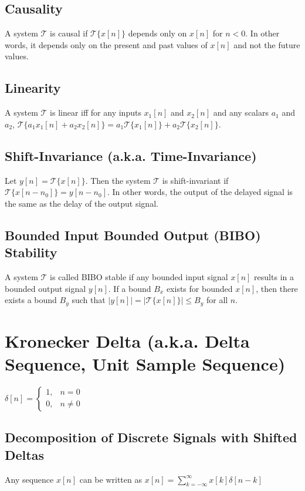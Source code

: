 \documentclass[11pt]{article}
\begin{document}
\subsection{Causality}
A system $\mathcal{T}$ is causal if $\mathcal{T}\{x[n]\}$ depends only on $x[n]$ for $n < 0$. In other words, it depends only on the present and past values of $x[n]$ and not the future values.

\subsection{Linearity}
A system $\mathcal{T}$ is linear iff for any inputs $x_1[n]$ and $x_2[n]$ and any scalars $a_1$ and $a_2$, $\mathcal{T}\{a_1x_1[n]+a_2x_2[n]\} = a_1\mathcal{T}\{x_1[n]\}+a_2\mathcal{T}\{x_2[n]\}$. 

\subsection{Shift-Invariance (a.k.a. Time-Invariance)}
Let $y[n] = \mathcal{T}\{x[n]\}$. Then the system $\mathcal{T}$ is shift-invariant if $\mathcal{T}\{x[n-n_0]\} = y[n-n_0]$. In other words, the output of the delayed signal is the same as the delay of the output signal.

\subsection{Bounded Input Bounded Output (BIBO) Stability}
A system $\mathcal{T}$ is called BIBO stable if any bounded input signal $x[n]$ results in a bounded output signal $y[n]$. If a bound $B_x$ exists for bounded $x[n]$, then there exists a bound $B_y$ such that $|y[n]|=|\mathcal{T}\{x[n]\}| \leq B_y$ for all $n$.

\section{Kronecker Delta (a.k.a. Delta Sequence, Unit Sample Sequence)}

$\delta[n] = \begin{cases}1, & n = 0 \\ 0, & n\neq 0 \end{cases}$

\subsection{Decomposition of Discrete Signals with Shifted Deltas}
Any sequence $x[n]$ can be written as $x[n]=\sum\limits_{k=-\infty}^\infty x[k]\delta[n-k]$
\end{document}
